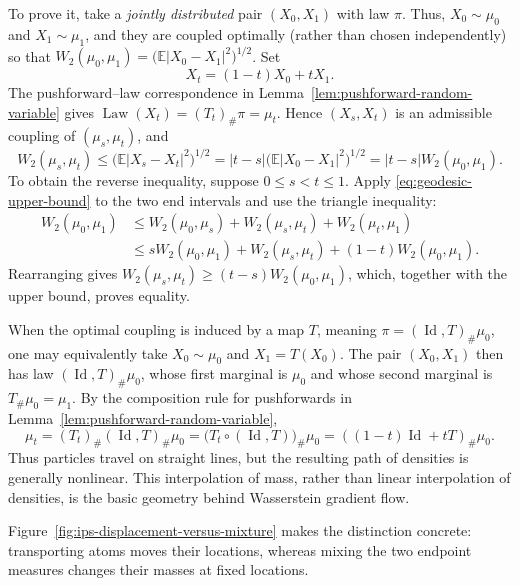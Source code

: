 \documentclass[11pt]{amsart}
\numberwithin{equation}{section}
\theoremstyle{plain}
\newcommand{\E}{\mathbb{E}}
\newcommand{\abs}[1]{\left\lvert#1\right\rvert}
\DeclareMathOperator{\Law}{Law}
\DeclareMathOperator{\Id}{Id}
\begin{document}
To prove it, take a \emph{jointly distributed}
pair $(X_0,X_1)$ with law $\pi$. Thus, $X_0\sim\mu_0$ and
$X_1\sim\mu_1$, and they are coupled optimally (rather than chosen
independently) so that $W_2(\mu_0,\mu_1)=\bigl(\E\abs{X_0-X_1}^2\bigr)^{1/2}$.  Set
\[
 X_t=(1-t)X_0+tX_1.
\]
The pushforward--law correspondence in
Lemma~\ref{lem:pushforward-random-variable} gives
$\Law(X_t)=(T_t)_\#\pi=\mu_t$.  Hence $(X_s,X_t)$ is an admissible coupling
of $(\mu_s,\mu_t)$, and
\begin{equation}\label{eq:geodesic-upper-bound}
 W_2(\mu_s,\mu_t)
 \leq\bigl(\E\abs{X_s-X_t}^2\bigr)^{1/2} = |t-s| \bigl(\E\abs{X_0-X_1}^2\bigr)^{1/2}
 =\abs{t-s}W_2(\mu_0,\mu_1).
\end{equation}
To obtain the reverse inequality, suppose $0\leq s<t\leq1$.  Apply
\eqref{eq:geodesic-upper-bound} to the two end intervals and use the triangle
inequality:
\begin{align*}
 W_2(\mu_0,\mu_1)
 &\leq W_2(\mu_0,\mu_s)+W_2(\mu_s,\mu_t)
       +W_2(\mu_t,\mu_1)\\
 &\leq sW_2(\mu_0,\mu_1)+W_2(\mu_s,\mu_t)
       +(1-t)W_2(\mu_0,\mu_1).
\end{align*}
Rearranging gives
$W_2(\mu_s,\mu_t)\geq(t-s)W_2(\mu_0,\mu_1)$, which, together with the
upper bound, proves equality.

When the optimal coupling is induced by
a map $T$, meaning $\pi=(\Id,T)_\#\mu_0$, one may equivalently take
$X_0\sim\mu_0$ and $X_1=T(X_0)$.  The pair $(X_0,X_1)$ then has law
$(\Id,T)_\#\mu_0$, whose first marginal is $\mu_0$ and whose second marginal
is $T_\#\mu_0=\mu_1$.  By the composition rule for pushforwards in
Lemma~\ref{lem:pushforward-random-variable},
\[
 \mu_t=(T_t)_\#(\Id,T)_\#\mu_0
 =\bigl(T_t\circ(\Id,T)\bigr)_\#\mu_0
 =((1-t)\Id+tT)_\#\mu_0.
\]
Thus particles travel on straight lines, but the
resulting path of densities is generally nonlinear.  This interpolation of
mass, rather than linear interpolation of densities, is the basic geometry
behind Wasserstein gradient flow.

Figure~\ref{fig:ips-displacement-versus-mixture} makes the distinction
concrete: transporting atoms moves their locations, whereas mixing the two
endpoint measures changes their masses at fixed locations.
\end{document}
